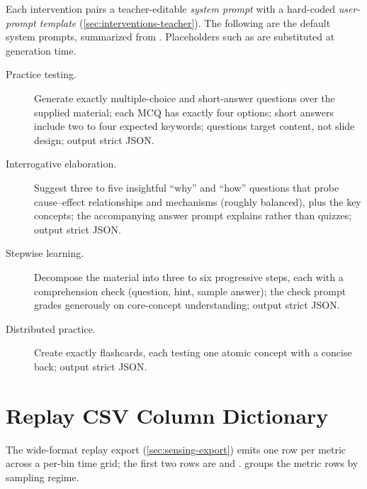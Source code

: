 Each intervention pairs a teacher-editable \emph{system prompt} with a
hard-coded \emph{user-prompt template} (\cref{sec:interventions-teacher}).
The following are the default system prompts, summarized from
.
Placeholders such as  are substituted at generation
time.

\begin{description}
  \item[Practice testing.] Generate exactly 
  multiple-choice and  short-answer questions
  over the supplied material; each MCQ has exactly four options; short
  answers include two to four expected keywords; questions target content,
  not slide design; output strict JSON.
  \item[Interrogative elaboration.] Suggest three to five insightful
  ``why'' and ``how'' questions that probe cause--effect relationships and
  mechanisms (roughly balanced), plus the key concepts; the accompanying
  answer prompt explains rather than quizzes; output strict JSON.
  \item[Stepwise learning.] Decompose the material into three to six
  progressive steps, each with a comprehension check (question, hint,
  sample answer); the check prompt grades generously on core-concept
  understanding; output strict JSON.
  \item[Distributed practice.] Create exactly 
  flashcards, each testing one atomic concept with a concise back; output
  strict JSON.
\end{description}


\chapter{Replay CSV Column Dictionary}
\label{app:csvdict}

The wide-format replay export (\cref{sec:sensing-export}) emits one row per
metric across a per-bin time grid; the first two rows are
 and .  groups the
metric rows by sampling regime.

